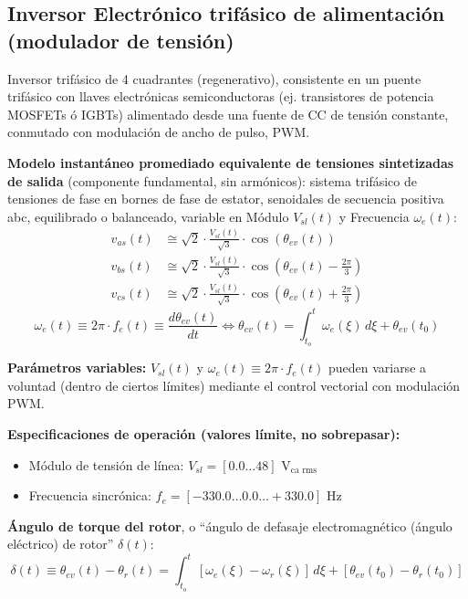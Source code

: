 \documentclass[11pt,a4paper]{article}
\begin{document}
\subsection*{Inversor Electrónico trifásico de alimentación (modulador de tensión)}
Inversor trifásico de 4 cuadrantes (regenerativo), consistente en un puente trifásico con llaves electrónicas semiconductoras (ej. transistores de potencia MOSFETs ó IGBTs) alimentado desde una fuente de CC de tensión constante, conmutado con modulación de ancho de pulso, PWM.

\textbf{Modelo instantáneo promediado equivalente de tensiones sintetizadas de salida} (componente fundamental, sin armónicos): sistema trifásico de tensiones de fase en bornes de fase de estator, senoidales de secuencia positiva abc, equilibrado o balanceado, variable en Módulo $V_{sl}(t)$ y Frecuencia $\omega_e(t)$:
\begin{align}
v_{as}(t) &\cong \sqrt{2} \cdot \frac{V_{sl}(t)}{\sqrt{3}} \cdot \cos(\theta_{ev}(t)) \tag{Ec. 4.1} \\
v_{bs}(t) &\cong \sqrt{2} \cdot \frac{V_{sl}(t)}{\sqrt{3}} \cdot \cos\left(\theta_{ev}(t) - \frac{2\pi}{3}\right) \tag{Ec. 4.2} \\
v_{cs}(t) &\cong \sqrt{2} \cdot \frac{V_{sl}(t)}{\sqrt{3}} \cdot \cos\left(\theta_{ev}(t) + \frac{2\pi}{3}\right) \tag{Ec. 4.3}
\end{align}
\begin{equation}
\omega_e(t) \equiv 2\pi \cdot f_e(t) \equiv \frac{d\theta_{ev}(t)}{dt} \Leftrightarrow \theta_{ev}(t) = \int_{t_o}^t \omega_e(\xi) \, d\xi + \theta_{ev}(t_0) \tag{Ec. 4.4}
\end{equation}

\textbf{Parámetros variables:}
$V_{sl}(t)$ y $\omega_e(t) \equiv 2\pi \cdot f_e(t)$ pueden variarse a voluntad (dentro de ciertos límites) mediante el control vectorial con modulación PWM.

\textbf{Especificaciones de operación (valores límite, no sobrepasar):}
\begin{itemize}
    \item Módulo de tensión de línea: $V_{sl} = [0.0 \dots 48] \text{ V}_{\text{ca rms}}$
    \item Frecuencia sincrónica: $f_e = [-330.0 \dots 0.0 \dots +330.0] \text{ Hz}$
\end{itemize}

\textbf{Ángulo de torque del rotor}, o ``ángulo de defasaje electromagnético (ángulo eléctrico) de rotor'' $\delta(t)$:
\begin{equation}
\delta(t) \equiv \theta_{ev}(t) - \theta_r(t) = \int_{t_o}^t [\omega_e(\xi) - \omega_r(\xi)] \, d\xi + [\theta_{ev}(t_0) - \theta_r(t_0)] \tag{Ec. 4.5}
\end{equation}
\end{document}
